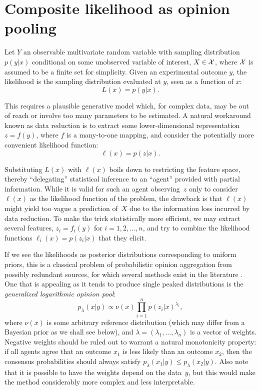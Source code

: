 \documentclass[english]{scrartcl}
\begin{document}
\section{Composite likelihood as opinion pooling}
\label{sec:log_pool}

Let $Y$ an observable multivariate random variable with sampling distribution $p(y|x)$ conditional on some unobserved variable of interest, $X\in{\cal X}$, where ${\cal X}$ is assumed to be a finite set for simplicity. Given an experimental outcome $y$, the likelihood is the sampling distribution evaluated at $y$, seen as a function of $x$:
$$
L(x) = p(y|x)
.
$$

This requires a plausible generative model which, for complex data, may be out of reach or involve too many parameters to be estimated. A natural workaround known as data reduction is to extract some lower-dimensional representation $z=f(y)$, where $f$ is a many-to-one mapping, and consider the potentially more convenient likelihood function:
$$
\ell(x) = p(z|x)
.
$$

Substituting $L(x)$ with $\ell(x)$ boils down to restricting the feature space, thereby  ``delegating'' statistical inference to an ``agent'' provided with partial information. While it is valid for such an agent observing~$z$ only to consider $\ell(x)$ as the likelihood function of the problem, the drawback is that $\ell(x)$ might yield too vague a prediction of~$X$ due to the information loss incurred by data reduction. To make the trick statistically more efficient, we may extract several features, $z_i=f_i(y)$ for $i=1,2,\ldots,n$, and try to combine the likelihood functions $\ell_i(x) = p(z_i|x)$ that they elicit.

If we see the likelihoods as posterior distributions corresponding to uniform priors, this is a classical problem of probabilistic opinion aggregation from possibly redundant sources, for which several methods exist in the literature \cite{Tarantola-82,Genest-86,Garg-04,Allard-12}. One that is appealing as it tends to produce single peaked distributions is the {\em generalized logarithmic opinion pool}:
\begin{equation}
\label{eq:log_pool}
p_\lambda(x|y) \propto \nu(x) \prod_{i=1}^n p(z_i|x)^{\lambda_i},
\end{equation} 
where $\nu(x)$ is some arbitrary reference distribution (which may differ from a Bayesian prior as we shall see below), and $\lambda=(\lambda_1,\ldots,\lambda_n)$ is a vector of weights. Negative weights should be ruled out to warrant a natural monotonicity property: if all agents agree that an outcome $x_1$ is less likely than an outcome $x_2$, then the consensus probabilities should always satisfy $p_\lambda(x_1|y)\leq p_\lambda(x_2|y)$. Also note that it is possible to have the weights depend on the data~$y$, but this would make the method considerably more complex and less interpretable. 
\end{document}
